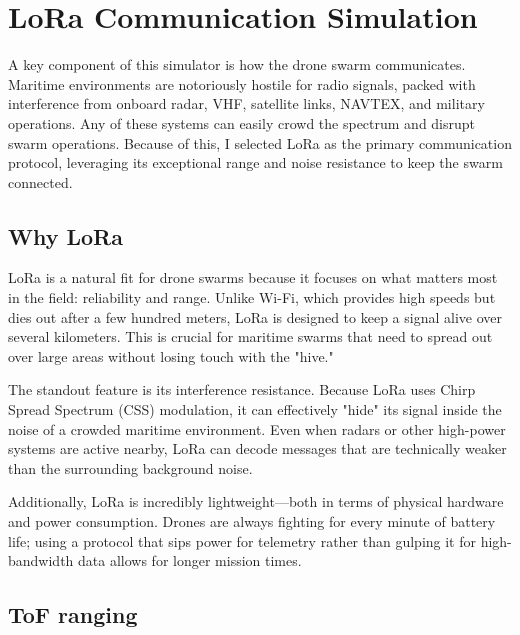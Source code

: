 

\section{LoRa Communication Simulation}
\label{sec:lora_simulation}

A key component of this simulator is how the drone swarm communicates. Maritime 
environments are notoriously hostile for radio signals, packed with interference from 
onboard radar, VHF, satellite links, NAVTEX, and military operations. Any of these 
systems can easily crowd the spectrum and disrupt swarm operations. 
Because of this, I selected LoRa as the primary communication protocol, leveraging its exceptional range 
and noise resistance to keep the swarm connected.


\subsection{Why LoRa}

LoRa is a natural fit for drone swarms because it focuses on what matters most in the field: reliability and range. Unlike Wi-Fi, which provides high speeds but dies out after a few hundred meters, LoRa is designed to keep a signal alive over several kilometers. This is crucial for maritime swarms that need to spread out over large areas without losing touch with the "hive."

The standout feature is its interference resistance. Because LoRa uses Chirp Spread Spectrum (CSS) modulation, it can effectively "hide" its signal inside the noise of a crowded maritime environment. Even when radars or other high-power systems are active nearby, LoRa can decode messages that are technically weaker than the surrounding background noise.

Additionally, LoRa is incredibly lightweight—both in terms of physical hardware and power consumption. Drones are always fighting for every minute of battery life; using a protocol that sips power for telemetry rather than gulping it for high-bandwidth data allows for longer mission times.


\subsection{ToF ranging}


